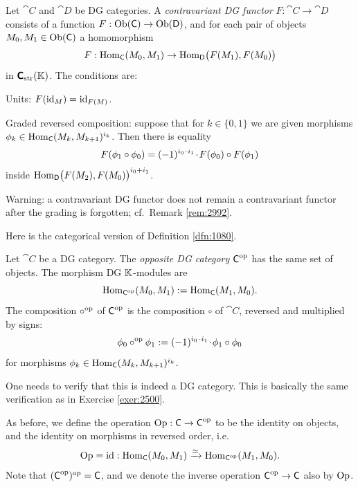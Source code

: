 \begin{dfn} \label{dfn:2495}
Let $\cat{C}$ and $\cat{D}$ be DG categories.
A {\em contravariant DG functor}%
$F : \cat{C} \to \cat{D}$ consists of a function 
$F : \operatorname{Ob}(\operatorname{\mathsf{C}}) \to \operatorname{Ob}(\operatorname{\mathsf{D}})$,
and for each pair of objects $M_0, M_1 \in \operatorname{Ob}(\operatorname{\mathsf{C}})$ a homomorphism 
\[ F : \operatorname{Hom}_{\operatorname{\mathsf{C}}}(M_0, M_1) \to 
\operatorname{Hom}_{\operatorname{\mathsf{D}}} \bigl( F(M_1), F(M_0) \bigr) \]
in $\boldsymbol{\mathsf{C}}_{\mathrm{str}}(\mathbb{K})$. The conditions are:
\begin{itemize}
 Units: $F(\operatorname{id}_M) = \operatorname{id}_{F(M)}$. 

 Graded reversed composition: suppose that for $k \in \{ 0, 1 \}$
we are given morphisms 
$\phi_k \in \operatorname{Hom}_{\operatorname{\mathsf{C}}}(M_{k}, M_{k + 1})^{i_k}$.
Then there is equality 
\[ F(\phi_1 \circ \phi_0) = (-1)^{i_0 \mspace{1.5mu}{\cdot}\mspace{1.5mu} i_1} \mspace{1.5mu}{\cdot}\mspace{1.5mu} F(\phi_0) \circ F(\phi_1) \]
inside 
$\operatorname{Hom}_{\operatorname{\mathsf{D}}} \bigl( F(M_2), F(M_0) \bigr)^{i_0 + i_1}$.  
\end{itemize}
\end{dfn}

Warning: a contravariant DG functor does not remain a contravariant functor
after the grading is forgotten; cf.\ Remark \ref{rem:2992}. 

Here is the categorical version of Definition \ref{dfn:1080}.

\begin{dfn} \label{dfn:1272}
Let $\cat{C}$ be a DG category. The 
{\em opposite DG category}%
$\operatorname{\mathsf{C}}^{\mathrm{op}}$ has the same set of objects. The morphism DG $\mathbb{K}$-modules 
are
\[ \operatorname{Hom}_{\operatorname{\mathsf{C}}^{\mathrm{op}}} (M_0, M_1) := 
\operatorname{Hom}_{\operatorname{\mathsf{C}}} (M_1, M_0) . \]
The composition $\circ^{\mathrm{op}}$ of $\operatorname{\mathsf{C}}^{\mathrm{op}}$ is the composition 
$\circ$ of $\cat{C}$, reversed and multiplied by signs: 
\[ \phi_0 \circ^{\mathrm{op}} \phi_1 := 
(-1)^{i_0 \mspace{1.5mu}{\cdot}\mspace{1.5mu} i_1} \mspace{1.5mu}{\cdot}\mspace{1.5mu} \phi_1 \circ \phi_0  \]
for morphisms 
$\phi_k \in \operatorname{Hom}_{\operatorname{\mathsf{C}}} (M_k, M_{k + 1})^{i_k}$.
\end{dfn}

One needs to verify that this is indeed a DG category. 
This is basically the same verification as in Exercise \ref{exer:2500}.

As before, we define the operation 
$\operatorname{Op} : \operatorname{\mathsf{C}} \to \operatorname{\mathsf{C}}^{\mathrm{op}}$
to be the identity on objects, and the identity on morphisms in reversed 
order, i.e.\ 
\[ \operatorname{Op} = \operatorname{id} : \operatorname{Hom}_{\operatorname{\mathsf{C}}} (M_0, M_1) \xrightarrow{\simeq} 
\operatorname{Hom}_{\operatorname{\mathsf{C}}^{\mathrm{op}}} (M_1, M_0) . \]
Note that $(\operatorname{\mathsf{C}}^{\mathrm{op}})^{\mathrm{op}} = \operatorname{\mathsf{C}}$, 
and we denote the inverse operation $\operatorname{\mathsf{C}}^{\mathrm{op}} \to \operatorname{\mathsf{C}}$
also by $\operatorname{Op}$. 

